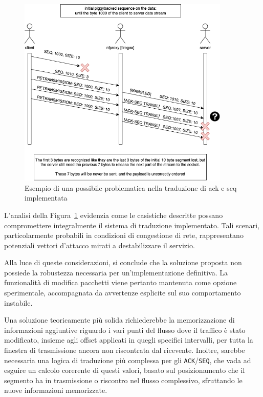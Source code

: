 \begin{figure}[H]
    \centering
    \includegraphics[width=0.90\textwidth]{images/chapter3/TCP_ack_seq_transl_failure.drawio.png}
    \caption{Esempio di una possibile problematica nella traduzione di ack e seq implementata}\label{fig:tcp_ack_seq_transl_failure}
\end{figure}
L'analisi della Figura~\ref{fig:tcp_ack_seq_transl_failure} evidenzia come le casistiche descritte possano compromettere integralmente il sistema di traduzione implementato. Tali scenari, particolarmente probabili in condizioni di congestione di rete, rappresentano potenziali vettori d'attacco mirati a destabilizzare il servizio.

Alla luce di queste considerazioni, si conclude che la soluzione proposta non possiede la robustezza necessaria per un'implementazione definitiva. La funzionalità di modifica pacchetti viene pertanto mantenuta come opzione sperimentale, accompagnata da avvertenze esplicite sul suo comportamento instabile.

Una soluzione teoricamente più solida richiederebbe la memorizzazione di informazioni aggiuntive riguardo i vari punti del flusso dove il traffico è stato modificato, insieme agli offset applicati in quegli specifici intervalli, per tutta la finestra di trasmissione ancora non riscontrata dal ricevente. Inoltre, sarebbe necessaria una logica di traduzione più complessa per gli \texttt{ACK}/\texttt{SEQ}, che vada ad esguire un calcolo corerente di questi valori, basato sul posizionamento che il segmento ha in trasmissione o riscontro nel flusso complessivo, sfruttando le nuove informazioni memorizzate.

